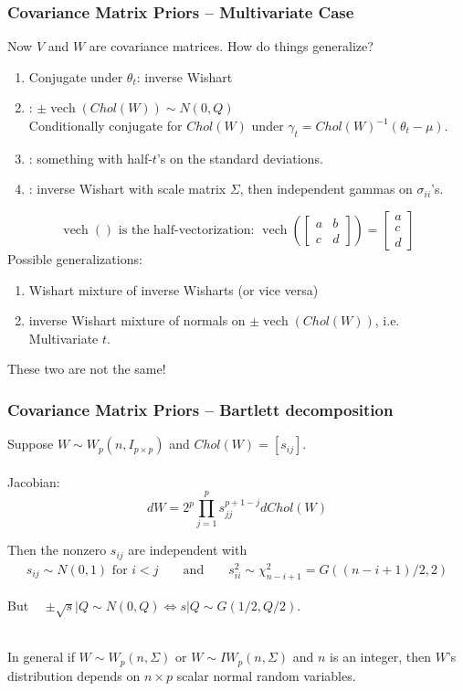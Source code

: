 \documentclass[xcolor=dvipsnames]{beamer}
\DeclareMathOperator{\vech}{vech}
\begin{document}
\begin{frame}
\frametitle{Covariance Matrix Priors -- Multivariate Case}
Now $V$ and $W$ are covariance matrices. How do things generalize?
\begin{enumerate}
\item Conjugate under $\theta_t$: inverse Wishart
\item \citet{fruhwirth2008bayesian}: $\pm\vech(Chol(W))\sim N(0,Q)$\\
Conditionally conjugate for $Chol(W)$ under $\gamma_t= Chol(W)^{-1}(\theta_t - \mu)$.
\item \citet{gelman2006prior}: something with half-$t$'s on the standard deviations.
\item \citet{huang2013simple}: inverse Wishart with scale matrix $\Sigma$, then independent gammas on $\sigma_{ii}$'s.
\end{enumerate}
\[
\mbox{$\vech()$ is the half-vectorization:  }\vech\left(\begin{bmatrix} a & b \\ c & d \end{bmatrix}\right) = \begin{bmatrix}a\\c\\d\end{bmatrix}
\]
\pause Possible generalizations:\\
\begin{enumerate}
\item Wishart mixture of inverse Wisharts (or vice versa)
\item inverse Wishart mixture of normals on $\pm\vech(Chol(W))$, i.e. Multivariate $t$.
\end{enumerate}
\pause These two are not the same! 
\end{frame}

\begin{frame}
\frametitle{Covariance Matrix Priors -- Bartlett decomposition}
Suppose $W\sim W_p(n, I_{p\times p})$ and $Chol(W)=[s_{ij}]$.\\~\\

Jacobian: 
\[
dW = 2^p\prod_{j=1}^ps_{jj}^{p+1-j} dChol(W)
\]

Then the nonzero $s_{ij}$ are independent with 
\begin{align*}
s_{ij}\sim N(0,1)\mbox{ for }i<j&&\mbox{ and }&& s_{ii}^2\sim\chi^2_{n-i+1} = G((n-i+1)/2, 2)
\end{align*}

\pause But \ \ $\pm \sqrt{s}|Q \sim N(0,Q) \iff s|Q\sim G(1/2,Q/2)$.\\~

In general if $W\sim W_p(n,\Sigma)$ or $W\sim IW_p(n,\Sigma)$ and $n$ is an integer, then $W$'s distribution depends on $n\times p$ scalar normal random variables.\\~

\end{frame}
\end{document}
